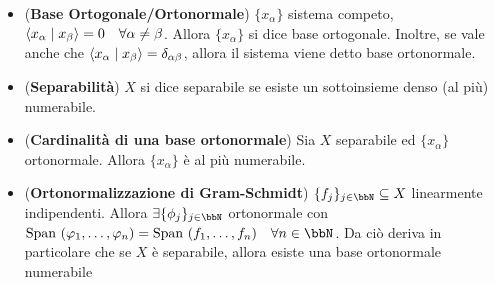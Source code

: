 \documentclass[a4paper,NoNotes,GeneralMath]{stdmdoc}
\begin{document}
\begin{itemize}
        \item ({\bf Base Ortogonale/Ortonormale}) $\{x_\alpha\}$ sistema competo, $\langle x_\alpha \mid x_\beta \rangle = 0 \quad \forall \alpha \neq \beta$. Allora $\{x_\alpha\}$ si dice base ortogonale. Inoltre, se vale anche che $\langle x_\alpha \mid x_\beta \rangle = \delta_{\alpha\beta}$, allora il sistema viene detto base ortonormale.
        \item ({\bf Separabilità}) $X$ si dice separabile se esiste un sottoinsieme denso (al più) numerabile.
        \item ({\bf Cardinalità di una base ortonormale}) Sia $X$ separabile ed $\{x_\alpha\}$ ortonormale. Allora $\{x_\alpha\}$ è al più numerabile.
        \item ({\bf Ortonormalizzazione di Gram-Schmidt}) $\{f_j\}_{j \in \bbN} \subseteq X$ linearmente indipendenti. Allora $\exists \{\phi_j\}_{j \in \bbN}$ ortonormale con $\Span(\varphi_1, \ldots, \varphi_n) = \Span(f_1, \ldots, f_n) \quad \forall n \in \bbN$. Da ciò deriva in particolare che se $X$ è separabile, allora esiste una base ortonormale numerabile
          
        \end{itemize}
        
\end{document}
